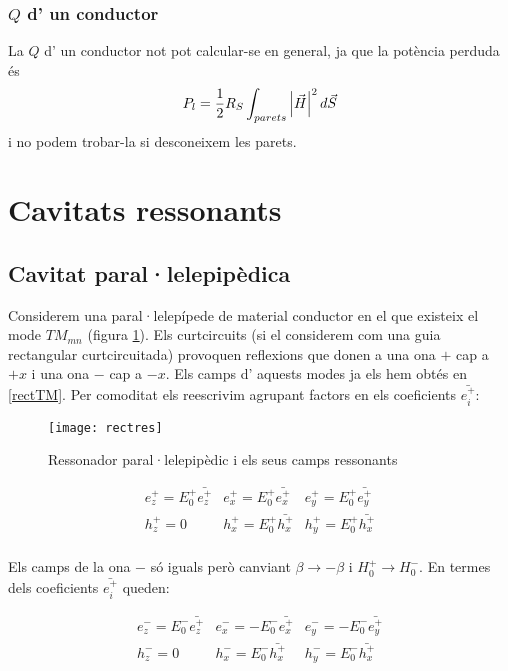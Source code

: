\subsubsection*{$Q$ d' un conductor}

La $Q$ d' un conductor not pot calcular-se en general, ja que la potència perduda és
\begin{equation}
  P_l = \frac{1}{2} R_S \int _{parets} \left\rvert \vec H \right\lvert ^2 d \vec S
\end{equation}
i no podem trobar-la si desconeixem les parets.

\section{Cavitats ressonants}

\subsection{Cavitat paral·lelepipèdica}

Considerem una paral·lelepípede de material conductor en el que existeix el mode $TM_{mn}$ (figura \cref{rectres}). Els curtcircuits (si el considerem com una guia rectangular curtcircuitada) provoquen reflexions que donen a una ona $+$ cap a $+x$ i una ona $-$ cap a $-x$. Els camps d' aquests modes ja els hem obtés en \cref{rectTM}. Per comoditat els reescrivim agrupant factors en els coeficients $\bar{e_i ^+}$:

\begin{figure}[ht]
  \centering
  \texttt{[image: rectres]}
  \caption{Ressonador paral·lelepipèdic i els seus camps ressonants }
  \label{rectres}
\end{figure}

\begin{equation}
  \nonumber
  \begin{array}{ccc}
    e_z^+  = E_0 ^+ \bar{e_z ^+} & e_x^+ = E_0 ^+ \bar {e_x ^+} & e_y ^+ = E_0 ^+ \bar{e_y ^+} \\
    h_z ^+ = 0 & h_x ^+ = E_0 ^+ \bar {h_x ^+} & h_y^ + = E_0 ^+ \bar {h_x ^+} \\ 
  \end{array}
\end{equation}

Els camps de la ona $-$ só iguals però canviant $\beta \to -\beta$ i $H_0 ^+ \to H_0 ^-$. En termes dels coeficients  $\bar{e_i ^+}$ queden:
 
\begin{equation}
  \nonumber
  \begin{array}{ccc}
    e_z ^- =  E_0 ^- \bar{e_z ^+} & e_x ^- = -E_0 ^- \bar {e_x ^+} & e_y ^- = -E_0 ^- \bar{e_y ^+} \\
    h_z ^- =  0 & h_x ^- =  E_0 ^- \bar {h_x ^+} & h_y ^- =  E_0 ^- \bar {h_x ^+} \\
  \end{array}
\end{equation}

